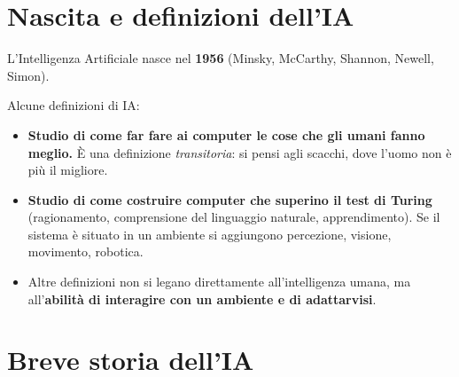 \section{Nascita e definizioni dell'IA}

L'Intelligenza Artificiale nasce nel \textbf{1956} (Minsky, McCarthy, Shannon,
Newell, Simon).


Alcune definizioni di IA:
\begin{itemize}
  \item \textbf{Studio di come far fare ai computer le cose che gli umani fanno
    meglio.} È una definizione \emph{transitoria}: si pensi agli scacchi, dove
    l'uomo non è più il migliore.
  \item \textbf{Studio di come costruire computer che superino il test di Turing}
    (ragionamento, comprensione del linguaggio naturale, apprendimento). Se il
    sistema è situato in un ambiente si aggiungono percezione, visione, movimento,
    robotica.
  \item Altre definizioni non si legano direttamente all'intelligenza umana, ma
    all'\textbf{abilità di interagire con un ambiente e di adattarvisi}.
\end{itemize}

\section{Breve storia dell'IA}

